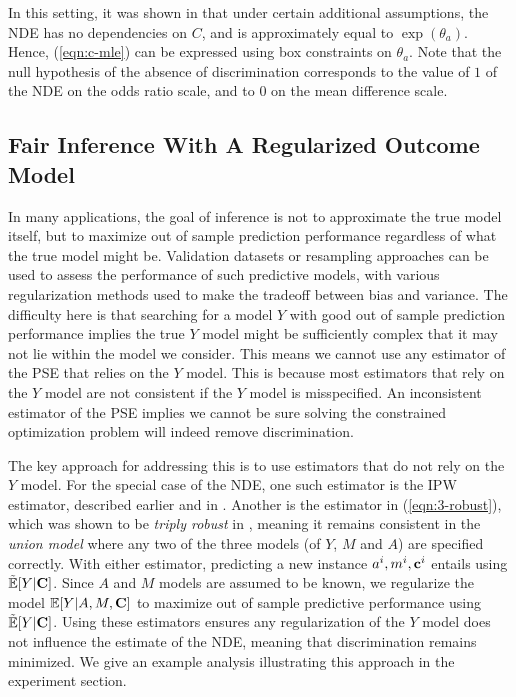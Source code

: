 \documentclass[letterpaper]{article} %
\newcommand{\citep}{\cite}
\begin{document}
In this setting, it was shown in \citep{tyler10odds} that under certain additional assumptions, the NDE has no dependencies on $C$, and is approximately equal to $\exp(\theta_a)$. Hence, (\ref{eqn:c-mle}) can be expressed using box constraints on $\theta_a$.  Note that the null hypothesis of the absence of discrimination corresponds to the value of $1$ of the NDE on the odds ratio scale, and to $0$ on the mean difference scale.

\subsection{Fair Inference With A Regularized Outcome Model}
\label{subsec:complex-y}

In many applications, the goal of inference is not to approximate the true model itself, but to maximize out of sample prediction performance regardless of what the true model might be.  Validation datasets or resampling approaches can be used to assess the performance of such predictive models, with various regularization methods used to make the tradeoff between bias and variance.  The difficulty here is that searching for a model $Y$ with good out of sample prediction performance implies the true $Y$ model might be sufficiently complex that it may not lie within the model we consider.  This means we cannot use any estimator of the PSE that relies on the $Y$ model.  This is because most estimators that rely on the $Y$ model are not consistent if the $Y$ model is misspecified.  An inconsistent estimator of the PSE %
implies we cannot be sure solving the constrained optimization problem will indeed remove discrimination.

The key approach for addressing this is to use estimators that do not rely on the $Y$ model.  For the special case of the NDE, one such estimator is the IPW estimator, described earlier and in \citep{tchetgen12semi2}.  Another is the estimator in (\ref{eqn:3-robust}),
which was shown to be \emph{triply robust} in \citep{tchetgen12semi2}, meaning it remains consistent in the \emph{union model} where any two of the three models (of $Y$, $M$ and $A$) are specified correctly.  With either estimator, predicting a new instance $a^i,m^i,{\bf c}^i$ entails using $\tilde{\mathbb E}[Y | {\bf C}]$.  Since $A$ and $M$ models are assumed to be known, we regularize the model $\mathbb{E}[Y | A,M,{\bf C}]$ to maximize out of sample predictive performance using $\tilde{\mathbb{E}}[Y | {\bf C}]$.  Using these estimators ensures any regularization of the $Y$ model does not influence the estimate of the NDE, meaning that discrimination remains minimized. We give an example analysis illustrating this approach in the experiment section.
\end{document}
